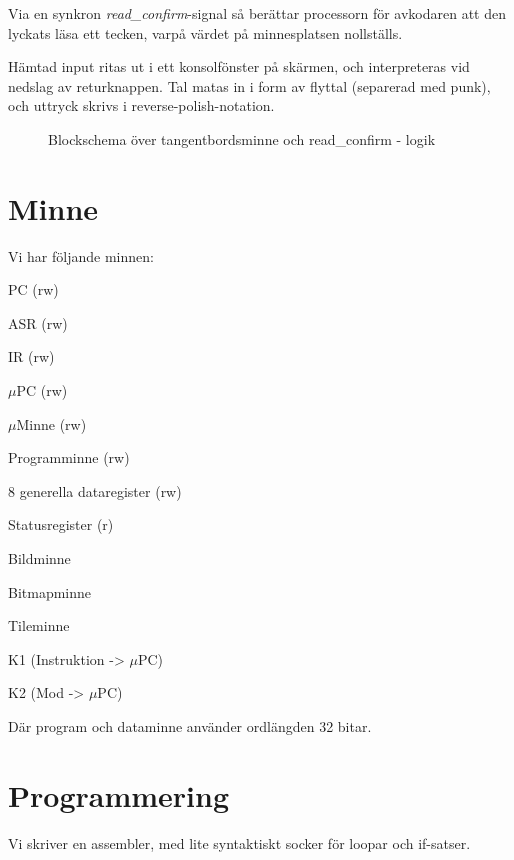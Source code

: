 \documentclass[]{article}
\begin{document}
Via en synkron \textit{read\_confirm}-signal så berättar processorn för avkodaren att den lyckats läsa ett tecken, varpå värdet på minnesplatsen nollställs.

Hämtad input ritas ut i ett konsolfönster på skärmen, och interpreteras vid nedslag av returknappen. Tal matas in i form av flyttal (separerad med punk), och uttryck skrivs i reverse-polish-notation.

\begin{figure}[h]
	\caption{Blockschema över tangentbordsminne och read\_confirm - logik}
\end{figure}

\newpage

\section{Minne}
Vi har följande minnen:
\begin{itemize*}
\item PC (rw)
\item ASR (rw)
\item IR (rw)
\item $\mu$PC (rw)
\item $\mu$Minne (rw)
\item Programminne (rw)
\item 8 generella dataregister (rw)
\item Statusregister (r)
\item Bildminne
\item Bitmapminne
\item Tileminne
\item K1 (Instruktion -> $\mu$PC)
\item K2 (Mod -> $\mu$PC)
\end{itemize*}
Där program och dataminne använder ordlängden 32 bitar.

\section{Programmering}
Vi skriver en assembler, med lite syntaktiskt socker för loopar och if-satser.
\end{document}

